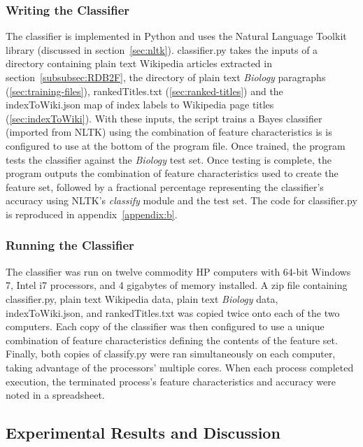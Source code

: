 \subsubsection{Writing the Classifier}

The classifier is implemented in Python and uses the Natural Language Toolkit library (discussed in section~\ref{sec:nltk}).
classifier.py takes the inputs of a directory containing plain text Wikipedia articles extracted in section~\ref{subsubsec:RDB2F}, the directory of plain text {\it Biology} paragraphs (\ref{sec:training-files}), rankedTitles.txt (\ref{sec:ranked-titles}) and the indexToWiki.json map of index labels to Wikipedia page titles (\ref{sec:indexToWiki}).
With these inputs, the script trains a \naive Bayes classifier (imported from NLTK) using the combination of feature characteristics is is configured to use at the bottom of the program file.
Once trained, the program tests the classifier against the {\it Biology} test set.
Once testing is complete, the program outputs the combination of feature characteristics used to create the feature set, followed by a fractional percentage representing the classifier's accuracy using NLTK's {\it classify} module and the test set.
The code for classifier.py is reproduced in appendix~\ref{appendix:b}.

\subsubsection{Running the Classifier}

The classifier was run on twelve commodity HP computers with 64-bit Windows 7, Intel i7 processors, and 4 gigabytes of memory installed.
A zip file containing classifier.py, plain text Wikipedia data, plain text {\it Biology} data, indexToWiki.json, and rankedTitles.txt was copied twice onto each of the two computers.
Each copy of the classifier was then configured to use a unique combination of feature characteristics defining the contents of the feature set.
Finally, both copies of classify.py were ran simultaneously on each computer, taking advantage of the processors' multiple cores.
When each process completed execution, the terminated process's feature characteristics and accuracy were noted in a spreadsheet.

\subsection{Experimental Results and Discussion}


